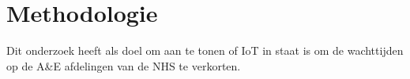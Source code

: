 \section{Methodologie}%
\label{sec:methodologie}







Dit onderzoek heeft als doel om aan te tonen of IoT in staat is om de wachttijden op de A\&E afdelingen van de NHS te verkorten.

